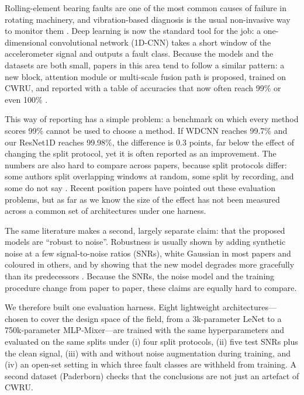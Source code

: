 \documentclass[11pt,a4paper]{article}
\begin{document}
Rolling-element bearing faults are one of the most common causes of failure in rotating machinery, and vibration-based diagnosis is the usual non-invasive way to monitor them \citep{randall2011tutorial}. Deep learning is now the standard tool for the job: a one-dimensional convolutional network (1D-CNN) takes a short window of the accelerometer signal and outputs a fault class. Because the models and the datasets are both small, papers in this area tend to follow a similar pattern: a new block, attention module or multi-scale fusion path is proposed, trained on CWRU, and reported with a table of accuracies that now often reach 99\% or even 100\% \citep{zhang2017wdcnn,zhao2019mcnn,m2024a,mst2024a}.

This way of reporting has a simple problem: a benchmark on which every method scores 99\% cannot be used to choose a method. If WDCNN reaches 99.7\% and our ResNet1D reaches 99.98\%, the difference is 0.3 points, far below the effect of changing the split protocol, yet it is often reported as an improvement. The numbers are also hard to compare across papers, because split protocols differ: some authors split overlapping windows at random, some split by recording, and some do not say \citep{phme2026,ssrn2024}. Recent position papers have pointed out these evaluation problems, but as far as we know the size of the effect has not been measured across a common set of architectures under one harness.

The same literature makes a second, largely separate claim: that the proposed models are “robust to noise”. Robustness is usually shown by adding synthetic noise at a few signal-to-noise ratios (SNRs), white Gaussian in most papers and coloured in others, and by showing that the new model degrades more gracefully than its predecessors \citep{zhang2018ticnn,mst2024b,sr2025a}. Because the SNRs, the noise model and the training procedure change from paper to paper, these claims are equally hard to compare.

We therefore built one evaluation harness. Eight lightweight architectures---chosen to cover the design space of the field, from a 3k-parameter LeNet to a 750k-parameter MLP-Mixer---are trained with the same hyperparameters and evaluated on the same splits under (i) four split protocols, (ii) five test SNRs plus the clean signal, (iii) with and without noise augmentation during training, and (iv) an open-set setting in which three fault classes are withheld from training. A second dataset (Paderborn) checks that the conclusions are not just an artefact of CWRU.
\end{document}
